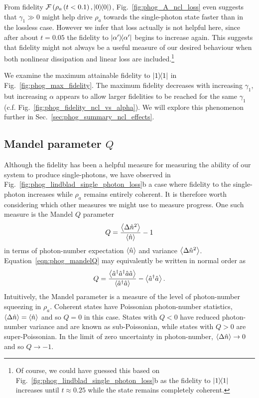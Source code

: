 From fidelity $\mathcal{F}\left( \rho_a\left(t<0.1\right), \dyad{0}\right)$, Fig.~\ref{fig:phog_A_ncl_loss} even suggests that $\gamma_1 \gg 0$ might help drive $\rho_a$ towards the single-photon state faster than in the lossless case. However we infer that loss actually is not helpful here, since after about $t=0.05$ the fidelity to $\dyad{\alpha^\prime}$ begins to increase again. This suggests that fidelity might not always be a useful measure of our desired behaviour when both nonlinear dissipation and linear loss are included.\footnote{Of course, we could have guessed this based on Fig.~\ref{fig:phog_lindblad_single_photon_loss}b as the fidelity to $\dyad{1}$ increases until $t\approx 0.25$ while the state remains completely coherent.}

We examine the maximum attainable fidelity to $\dyad{1}$ in Fig.~\ref{fig:phog_max_fidelity}. The maximum fidelity decreases with increasing $\gamma_1$, but increasing $\alpha$ appears to allow larger fidelities to be reached for the same $\gamma_1$ (c.f. Fig.~\ref{fig:phog_fidelity_ncl_vs_alpha}). We will explore this phenomenon further in Sec.~\ref{sec:phog_summary_ncl_effects}.


\subsection{Mandel parameter $Q$}
Although the fidelity has been a helpful measure for measuring the ability of our system to produce single-photons, we have observed in Fig.~\ref{fig:phog_lindblad_single_photon_loss}b a case where fidelity to the single-photon increases while $\rho_a$ remains entirely coherent. It is therefore worth considering which other measures we might use to measure progress. One such measure is the Mandel $Q$ parameter \cite{Mandel1979, Carmichael1999, Davidovich1996}
\begin{equation}\label{eqn:phog_mandelQ}
Q = \frac{\ev{\Delta\hat{n}^2}}{\ev{\hat{n}}} - 1
\end{equation}
in terms of photon-number expectation $\ev{\hat{n}}$ and variance $\ev{\Delta\hat{n}^2}$. Equation~\ref{eqn:phog_mandelQ} may equivalently be written in normal order as 
\begin{equation}
Q = \frac{\ev{\hat{a}^\dagger \hat{a}^\dagger \hat{a}\hat{a}}}{\ev{\hat{a}^\dagger \hat{a}}} - \ev{\hat{a}^\dagger \hat{a}}.
\end{equation}
Intuitively, the Mandel parameter is a measure of the level of photon-number squeezing in $\rho_a$. Coherent states have Poissonian photon-number statistics, $\ev{\Delta\hat{n}} = \ev{\hat{n}}$ and so $Q = 0$ in this case. States with $Q < 0$ have reduced photon-number variance and are known as sub-Poissonian, while states with $Q > 0$ are super-Poissonian. In the limit of zero uncertainty in photon-number, $\ev{\Delta\hat{n}} \rightarrow 0$ and so $Q \rightarrow -1$. 

